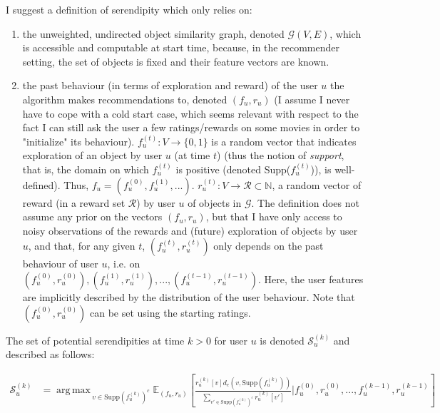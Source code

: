 \documentclass{article}
\DeclareMathOperator*{\argmax}{arg\,max\,}
\begin{document}
I suggest a definition of serendipity which only relies on:
\begin{enumerate} 
\item the unweighted, undirected object similarity graph, denoted $\mathscr{G}(V, E)$, which is accessible and computable at start time, because, in the recommender setting, the set of objects is fixed and their feature vectors are known.
\item the past behaviour (in terms of exploration and reward) of the user $u$ the algorithm makes recommendations to, denoted $(f_{u}, r_{u})$ (I assume I never have to cope with a cold start case, which seems relevant with respect to the fact I can still ask the user a few ratings/rewards on some movies in order to "initialize" its behaviour). $f^{(t)}_u : V \rightarrow \{0,1\}$ is a random vector that indicates exploration of an object by user $u$ (at time $t$) (thus the notion of \textit{support}, that is, the domain on which $f^{(t)}_{u}$ is positive (denoted Supp($f^{(t)}_{u}$)), is well-defined). Thus, $f_u = (f^{(0)}_u, f^{(1)}_u, ...)$. $r^{(t)}_u : V \rightarrow \mathscr{R} \subset \mathbb{N}$, a random vector of reward (in a reward set $\mathscr{R}$) by user $u$ of objects in $\mathscr{G}$. The definition does not assume any prior on the vectors $(f_{u}, r_{u})$, but that I have only access to noisy observations of the rewards and (future) exploration of objects by user $u$, and that, for any given $t$, $(f^{(t)}_{u}, r^{(t)}_{u})$ only depends on the past behaviour of user $u$, i.e. on $(f^{(0)}_{u}, r^{(0)}_{u}), (f^{(1)}_{u}, r^{(1)}_{u}), ..., (f^{(t-1)}_{u}, r^{(t-1)}_{u})$. Here, the user features are implicitly described by the distribution of the user behaviour. Note that $(f^{(0)}_{u}, r^{(0)}_{u})$ can be set using the starting ratings.
\end{enumerate}

The set of potential serendipities at time $k > 0$ for user $u$ is denoted $\mathscr{S}^{(k)}_{u}$ and described as follows:

\begin{equation}\label{eq:02}
\begin{split}
\mathscr{S}^{(k)}_{u} & = \argmax_{v \in \text{Supp}(f^{(k)}_{u})^{c}} \mathbb{E}_{(f_{u},r_{u})}[\frac{r^{(k)}_{u}[v]d_e(v, \text{Supp}(f^{(k)}_{u}))}{\sum_{v' \in \text{Supp}(f^{(k)}_{u})^{c}} r^{(k)}_{u}[v']} | f^{(0)}_{u}, r^{(0)}_{u}, ..., f^{(k-1)}_{u}, r^{(k-1)}_{u} ]\\
\end{split}
\end{equation}
\end{document}
